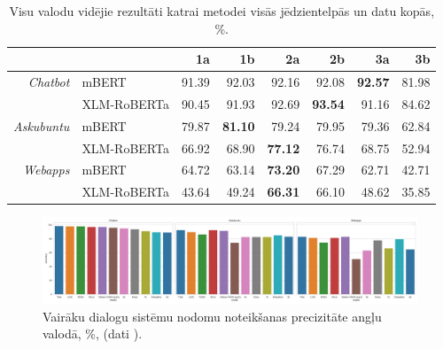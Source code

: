 \begin{table}[htbp]
  \centering
  \caption{Visu valodu vidējie rezultāti katrai metodei visās jēdzientelpās un datu kopās, \%.}
    \begin{tabular}{rlrrrrrr}\toprule
          &       & 1a    & 1b    & 2a    & 2b    & 3a    & 3b \\\midrule
    \textit{Chatbot} & mBERT & 91.39 & 92.03 & 92.16 & 92.08 & \textbf{92.57} & 81.98 \\
          & XLM-RoBERTa & 90.45 & 91.93 & 92.69 & \textbf{93.54} & 91.16 & 84.62 \\\midrule
    \textit{Askubuntu} & mBERT & 79.87 & \textbf{81.10} & 79.24 & 79.95 & 79.36 & 62.84 \\
          & XLM-RoBERTa & 66.92 & 68.90 & \textbf{77.12} & 76.74 & 68.75 & 52.94 \\\midrule
    \textit{Webapps} & mBERT & 64.72 & 63.14 & \textbf{73.20} & 67.29 & 62.71 & 42.71 \\
          & XLM-RoBERTa & 43.64 & 49.24 & \textbf{66.31} & 66.10 & 48.62 & 35.85 \\\bottomrule
    \end{tabular}%
  \label{tab:avg-method}%
\end{table}%


\begin{figure}[h]
   \centering
   \includegraphics[width=\linewidth]{figures/results.pdf}
   \caption{Vairāku dialogu sistēmu nodomu noteikšanas precizitāte angļu valodā, \%, (dati \cite{fasttext2019}).}
   \label{fig:comparison}
\end{figure}